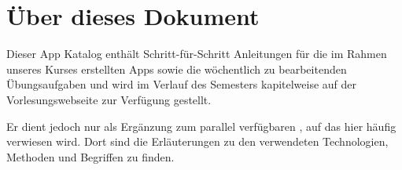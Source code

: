 \documentclass[parskip=half, final]{scrreprt}
\begin{document}
\maketitle

\tableofcontents


\chapter{Über dieses Dokument}

Dieser App Katalog enthält Schritt-für-Schritt Anleitungen für die im Rahmen unseres Kurses erstellten Apps sowie die wöchentlich zu bearbeitenden Übungsaufgaben und wird im Verlauf des Semesters kapitelweise auf der Vorlesungswebseite  zur Verfügung gestellt.

Er dient jedoch nur als Ergänzung zum parallel verfügbaren , auf das hier häufig verwiesen wird. Dort sind die Erläuterungen zu den verwendeten Technologien, Methoden und Begriffen zu finden.
\end{document}
